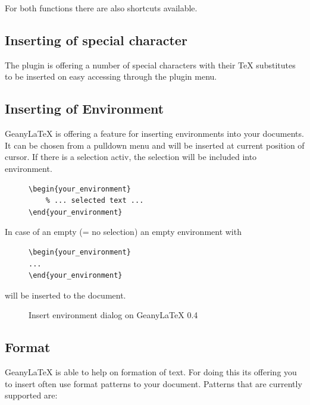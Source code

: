 \documentclass[%
a4paper,%
10pt,%
oneside,%
DIV18,
headsepline,
plainheadsepline,
footsepline,
plainfootsepline,
bibtotoc,%
liststotoc,%
BCOR12mm,%
halfparskip,%
openany,%
]{scrartcl}
\begin{document}
For both functions there are also shortcuts available.

\subsection{Inserting of special character}
The plugin is offering a number of special characters with their \TeX{}
substitutes to be inserted on easy accessing through the plugin menu.

\subsection{Inserting of Environment}
Geany\LaTeX{} is offering a feature for inserting environments into your
documents. It can be chosen from a pulldown menu and will be inserted at
current position of cursor. If there is a selection activ, the selection
will be included into environment.

\begin{figure}[h!]
\begin{lstlisting}
\begin{your_environment}
	% ... selected text ...
\end{your_environment}
\end{lstlisting}
\end{figure}

In case of an empty (= no selection) an empty environment with
\begin{figure}[h!]
\begin{lstlisting}
\begin{your_environment}
...
\end{your_environment}
\end{lstlisting}
\end{figure}

will be inserted to the document.

\begin{figure}[h!]
	\caption{Insert environment dialog on Geany\LaTeX{} 0.4}
\end{figure}


\subsection{Format}
Geany\LaTeX{} is able to help on formation of text. For doing this its
offering you to insert often use format patterns to your document.
Patterns that are currently supported are:
\end{document}
